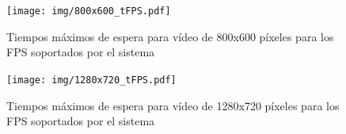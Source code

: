 \begin{figure}[!h]

	\texttt{[image: img/800x600\_tFPS.pdf]}
	\caption{Tiempos máximos de espera para vídeo de 800x600 píxeles para
	los FPS soportados por el sistema}
	\label{800tFPS}

\end{figure}

\begin{figure}[!h]

	\texttt{[image: img/1280x720\_tFPS.pdf]}
	\caption{Tiempos máximos de espera para vídeo de 1280x720 píxeles para
	los FPS soportados por el sistema}
	\label{1280tFPS}

\end{figure}

